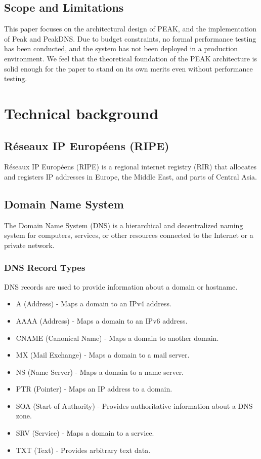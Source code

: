 \documentclass[12pt]{article}
\begin{document}
\subsection{Scope and Limitations}
This paper focuses on the architectural design of PEAK, and the implementation of Peak and PeakDNS.
Due to budget constraints, no formal performance testing has been conducted, and the system has not been deployed in a production environment.
We feel that the theoretical foundation of the PEAK architecture is solid enough for the paper to stand on its own merits even without performance testing.

\section{Technical background}
\subsection{Réseaux IP Européens (RIPE)}
Réseaux IP Européens (RIPE)\cite{WelcomeRIPERIPE2024} is a regional internet registry (RIR) 
that allocates and registers IP addresses in Europe, the Middle East, and parts of Central Asia.

\subsection{Domain Name System}
The Domain Name System (DNS)\cite{DomainNamesImplementation1987} is a hierarchical and decentralized naming system for computers, 
services, or other resources connected to the Internet or a private network.
\subsubsection{DNS Record Types}
DNS records are used to provide information about a domain or hostname.
\begin{itemize}
    \item A (Address) - Maps a domain to an IPv4 address.
    \item AAAA (Address) - Maps a domain to an IPv6 address.
    \item CNAME (Canonical Name) - Maps a domain to another domain.
    \item MX (Mail Exchange) - Maps a domain to a mail server.
    \item NS (Name Server) - Maps a domain to a name server.
    \item PTR (Pointer) - Maps an IP address to a domain.
    \item SOA (Start of Authority) - Provides authoritative information about a DNS zone.
    \item SRV (Service) - Maps a domain to a service.
    \item TXT (Text) - Provides arbitrary text data.
\end{itemize}
\end{document}
